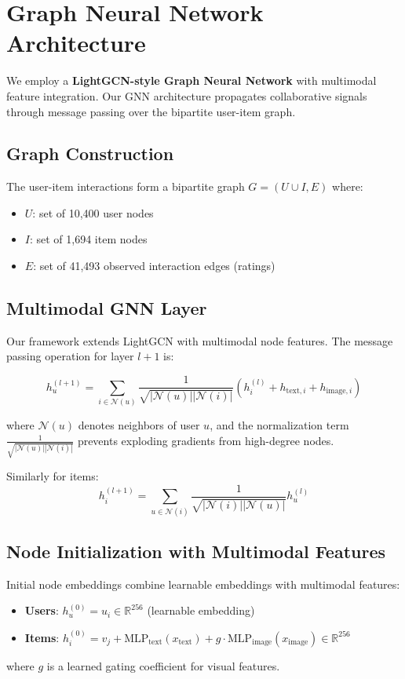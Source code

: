 \documentclass[12pt,a4paper]{report}
\begin{document}
{\section{Graph Neural Network Architecture}
We employ a \textbf{LightGCN-style Graph Neural Network} with multimodal feature integration. Our GNN architecture propagates collaborative signals through message passing over the bipartite user-item graph.

\subsection{Graph Construction}
The user-item interactions form a bipartite graph $G = (U \cup I, E)$ where:
\begin{itemize}
    \item $U$: set of 10,400 user nodes
    \item $I$: set of 1,694 item nodes
    \item $E$: set of 41,493 observed interaction edges (ratings)
\end{itemize}

\subsection{Multimodal GNN Layer}
Our framework extends LightGCN with multimodal node features. The message passing operation for layer $l+1$ is:

\begin{equation}
h_u^{(l+1)} = \sum_{i \in \mathcal{N}(u)} \frac{1}{\sqrt{|\mathcal{N}(u)||\mathcal{N}(i)|}} \left( h_i^{(l)} + h_{\text{text},i} + h_{\text{image},i} \right)
\end{equation}

where $\mathcal{N}(u)$ denotes neighbors of user $u$, and the normalization term $\frac{1}{\sqrt{|\mathcal{N}(u)||\mathcal{N}(i)|}}$ prevents exploding gradients from high-degree nodes.

Similarly for items:
\begin{equation}
h_i^{(l+1)} = \sum_{u \in \mathcal{N}(i)} \frac{1}{\sqrt{|\mathcal{N}(i)||\mathcal{N}(u)|}} h_u^{(l)}
\end{equation}

\subsection{Node Initialization with Multimodal Features}
Initial node embeddings combine learnable embeddings with multimodal features:
\begin{itemize}
    \item \textbf{Users}: $h_u^{(0)} = u_i \in \mathbb{R}^{256}$ (learnable embedding)
    \item \textbf{Items}: $h_i^{(0)} = v_j + \text{MLP}_{\text{text}}(x_{\text{text}}) + g \cdot \text{MLP}_{\text{image}}(x_{\text{image}}) \in \mathbb{R}^{256}$
\end{itemize}
where $g$ is a learned gating coefficient for visual features.

}
\end{document}
